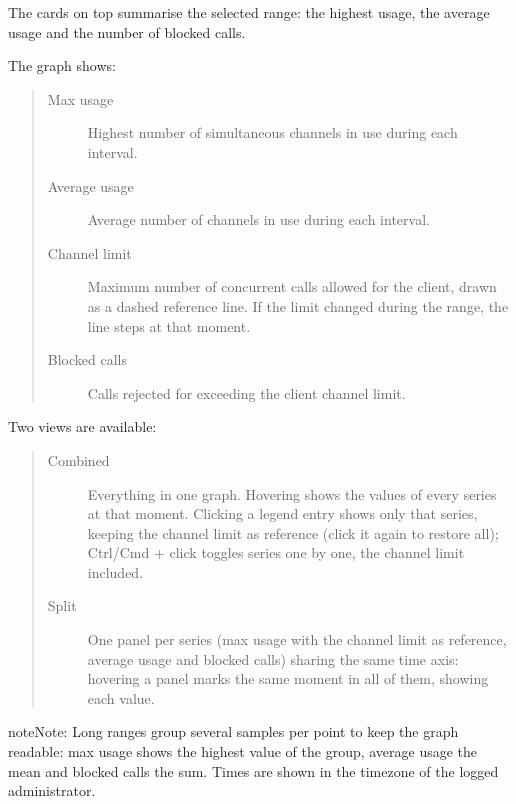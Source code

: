 \documentclass[letterpaper,10pt,english]{sphinxmanual}
\begin{document}
The cards on top summarise the selected range: the highest usage, the average usage and the number of blocked calls.

The graph shows:
\begin{quote}
\begin{description}
\item[{Max usage}] \leavevmode
Highest number of simultaneous channels in use during each interval.

\item[{Average usage}] \leavevmode
Average number of channels in use during each interval.

\item[{Channel limit}] \leavevmode
Maximum number of concurrent calls allowed for the client, drawn as a dashed reference line. If the limit
changed during the range, the line steps at that moment.

\item[{Blocked calls}] \leavevmode
Calls rejected for exceeding the client channel limit.

\end{description}
\end{quote}

Two views are available:
\begin{quote}
\begin{description}
\item[{Combined}] \leavevmode
Everything in one graph. Hovering shows the values of every series at that moment. Clicking a legend entry
shows only that series, keeping the channel limit as reference (click it again to restore all); Ctrl/Cmd +
click toggles series one by one, the channel limit included.

\item[{Split}] \leavevmode
One panel per series (max usage with the channel limit as reference, average usage and blocked calls) sharing
the same time axis: hovering a panel marks the same moment in all of them, showing each value.

\end{description}
\end{quote}

\begin{notice}{note}{Note:}
Long ranges group several samples per point to keep the graph readable: max usage shows the highest value
of the group, average usage the mean and blocked calls the sum. Times are shown in the timezone of the
logged administrator.
\end{notice}
\end{document}
